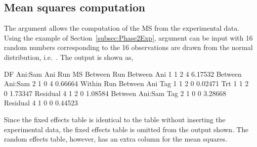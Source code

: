 \documentclass[article]{jss}
\begin{document}
\subsection{Mean squares computation}
The argument  allows the computation of the MS from the experimental data. Using the example of Section~\ref{subsec:Phase2Exp},  argument can be input with 16 random numbers corresponding to the 16 observations are drawn from the normal distribution, i.e.\ . The output is shown as,
\begin{CodeChunk}
\begin{CodeOutput} 
                   DF Ani:Sam Ani Run MS     
Between Run                                  
   Between Ani     1  1       2   4   6.17532
   Between Ani:Sam 2  1       0   4   0.66664
Within Run                                   
   Between Ani                               
      Tag          1  1       2   0   0.02471
      Trt          1  1       2   0   1.73347
      Residual     4  1       2   0   1.08584
   Between Ani:Sam                           
      Tag          2  1       0   0   3.28668
      Residual     4  1       0   0   0.44523
\end{CodeOutput}
\end{CodeChunk}  
Since the fixed effects table is identical to the table without inserting the experimental data, the fixed effects table is omitted from the output shown. The random effects table, however, has an extra column for the mean squares.
\end{document}
